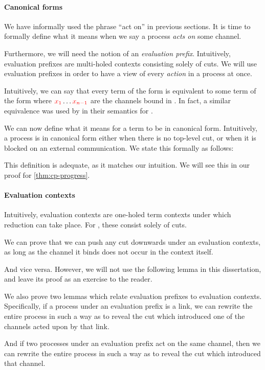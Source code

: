 \paragraph{Canonical forms}
We have informally used the phrase ``act on'' in previous sections. It is time
to formally define what it means when we say a process \emph{acts on} some
channel.

Furthermore, we will need the notion of an \emph{evaluation prefix}.
Intuitively, evaluation prefixes are multi-holed contexts consisting solely of
cuts. We will use evaluation prefixes in order to have a view of every
\emph{action} in a process at once.

Intuitively, we can say that every term of the form
 is equivalent to some term of the form
where $\textcolor{red}{x_1} \dots \textcolor{red}{x_{n-1}}$ are the channels bound in .
In fact, a similar equivalence was used by \citeauthor{lindley2015semantics}
\cite{lindley2015semantics} in their semantics for \cp. 

We can now define what it means for a term to be in canonical form. Intuitively,
a process is in canonical form either when there is no top-level cut, or when it
is blocked on an external communication. We state this formally as follows:

This definition is adequate, as it matches our intuition. We will see this in
our proof for \cref{thm:cp-progress}. 

\paragraph{Evaluation contexts}
Intuitively, evaluation contexts are one-holed term contexts under which
reduction can take place. For \rcp, these consist solely of cuts.

We can prove that we can push any cut downwards under an evaluation contexts, as
long as the channel it binds does not occur in the context itself.

And vice versa. However, we will not use the following lemma in this
dissertation, and leave its proof as an exercise to the reader.

We also prove two lemmas which relate evaluation prefixes to evaluation
contexts.
Specifically, if a process under an evaluation prefix is a link, we can rewrite
the entire process in such a way as to reveal the cut which introduced one of
the channels acted upon by that link.

And if two processes under an evaluation prefix act on the same channel, then we
can rewrite the entire process in such a way as to reveal the cut which
introduced that channel. 



